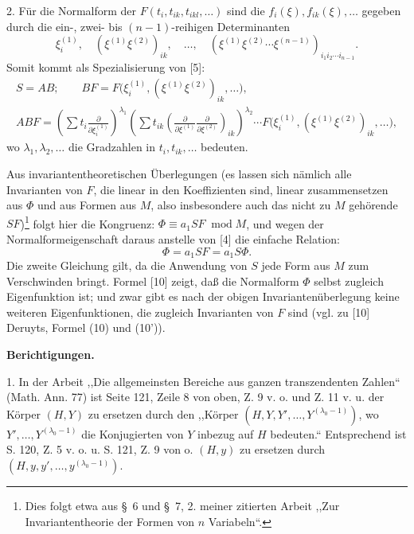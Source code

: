 \documentclass[11pt]{article}
\providecommand{\p}{\partial}
\providecommand{\modu}[1]{\;\operatorname{mod} #1}
\begin{document}
2. Für die Normalform der $F(t_i,t_{ik},t_{ikl},\ldots)$ sind die $f_i(\xi),f_{ik}(\xi),\ldots$ gegeben durch die ein-, zwei- bis $(n-1)$-reihigen Determinanten
\[
        \xi_i^{(1)},\quad (\xi^{(1)}\xi^{(2)})_{ik},\quad\ldots,\quad
        (\xi^{(1)}\xi^{(2)}\cdots\xi^{(n-1)})_{i_1i_2\cdots i_{n-1}}.
\]
Somit kommt als Spezialisierung von [5]:
\[
\begin{gathered}
        S=AB;\qquad
        BF=F\bigl(\xi_i^{(1)},(\xi^{(1)}\xi^{(2)})_{ik},\ldots\bigr),\\
        ABF=\left(\sum t_i\frac{\p}{\p\xi_i^{(1)}}\right)^{\lambda_1}
        \left(\sum t_{ik}\left(\frac{\p}{\p\xi^{(1)}}\frac{\p}{\p\xi^{(2)}}\right)_{ik}\right)^{\lambda_2}
        \cdots F\bigl(\xi_i^{(1)},(\xi^{(1)}\xi^{(2)})_{ik},\ldots\bigr),
\end{gathered}
\]
wo $\lambda_1,\lambda_2,\ldots$ die Gradzahlen in $t_i,t_{ik},\ldots$ bedeuten.

Aus invariantentheoretischen Überlegungen (es lassen sich nämlich alle Invarianten von $F$, die linear in den Koeffizienten sind, linear zusammensetzen aus $\Phi$ und aus Formen aus $M$, also insbesondere auch das nicht zu $M$ gehörende $SF$)\footnote{Dies folgt etwa aus \S~6 und \S~7, 2. meiner zitierten Arbeit ,,Zur Invariantentheorie der Formen von $n$ Variabeln``.} folgt hier die Kongruenz: $\Phi\equiv a_1SF\modu{M}$, und wegen der Normalformeigenschaft daraus anstelle von [4] die einfache Relation:
\begin{equation}
        \Phi=a_1SF=a_1S\Phi.
\tag{10}
\end{equation}
Die zweite Gleichung gilt, da die Anwendung von $S$ jede Form aus $M$ zum Verschwinden bringt. Formel [10] zeigt, daß die Normalform $\Phi$ selbst zugleich Eigenfunktion ist; und zwar gibt es nach der obigen Invariantenüberlegung keine weiteren Eigenfunktionen, die zugleich Invarianten von $F$ sind (vgl. zu [10] Deruyts, Formel (10) und (10')).

\begin{center}
\textbf{Berichtigungen.}
\end{center}

1. In der Arbeit ,,Die allgemeinsten Bereiche aus ganzen transzendenten Zahlen`` (Math. Ann. 77) ist Seite 121, Zeile 8 von oben, Z. 9 v. o. und Z. 11 v. u. der Körper $(H,Y)$ zu ersetzen durch den ,,Körper $(H,Y,Y',\ldots,Y^{(\lambda_0-1)})$, wo $Y',\ldots,Y^{(\lambda_0-1)}$ die Konjugierten von $Y$ inbezug auf $H$ bedeuten.`` Entsprechend ist S. 120, Z. 5 v. o. u. S. 121, Z. 9 von o. $(H,y)$ zu ersetzen durch $(H,y,y',\ldots,y^{(\lambda_0-1)})$.
\end{document}
